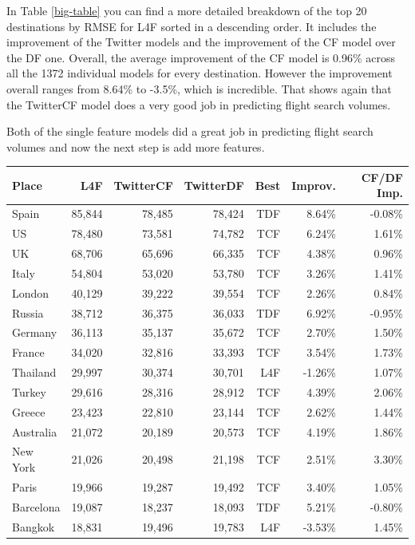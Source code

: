 \documentclass[minf,twoside,singlespacing,parskip,frontabs,notimes,11pt]{infthesis}
\begin{document}
In Table \ref{big-table} you can find a more detailed breakdown of the top 20 destinations by RMSE for L4F sorted in a descending order. It includes the improvement of the Twitter models and the improvement of the CF model over the DF one. Overall, the average improvement of the CF model is 0.96\% across all the 1372 individual models for every destination. However the improvement overall ranges from 8.64\% to -3.5\%, which is incredible. That shows again that the TwitterCF model does a very good job in predicting flight search volumes. 


Both of the single feature models did a great job in predicting flight search volumes and now the next step is add more features. 

\begin{table}[p]
\begin{center}
\begin{tabular}{ l | r | r | r | r | r | r }
Place & L4F &  TwitterCF & TwitterDF & Best & Improv. & CF/DF Imp. \\
\hline
Spain & 85,844 & 78,485 & 78,424 & TDF & 8.64\% & -0.08\%\\
US & 78,480 & 73,581 & 74,782 & TCF & 6.24\% & 1.61\%\\
UK & 68,706 & 65,696 & 66,335 & TCF & 4.38\% & 0.96\%\\
Italy & 54,804 & 53,020 & 53,780 & TCF & 3.26\% & 1.41\%\\
London & 40,129 & 39,222 & 39,554 & TCF & 2.26\% & 0.84\%\\
Russia & 38,712 & 36,375 & 36,033 & TDF & 6.92\% & -0.95\%\\
Germany & 36,113 & 35,137 & 35,672 & TCF & 2.70\% & 1.50\%\\
France & 34,020 & 32,816 & 33,393 & TCF & 3.54\% & 1.73\%\\
Thailand & 29,997 & 30,374 & 30,701 & L4F & -1.26\% & 1.07\%\\
Turkey & 29,616 & 28,316 & 28,912 & TCF & 4.39\% & 2.06\%\\
Greece & 23,423 & 22,810 & 23,144 & TCF & 2.62\% & 1.44\%\\
Australia & 21,072 & 20,189 & 20,573 & TCF & 4.19\% & 1.86\%\\
New York & 21,026 & 20,498 & 21,198 & TCF & 2.51\% & 3.30\%\\
Paris & 19,966 & 19,287 & 19,492 & TCF & 3.40\% & 1.05\%\\
Barcelona & 19,087 & 18,237 & 18,093 & TDF & 5.21\% & -0.80\%\\
Bangkok & 18,831 & 19,496 & 19,783 & L4F & -3.53\% & 1.45\%\\

\end{tabular}
\end{center}
\end{table}
\end{document}
